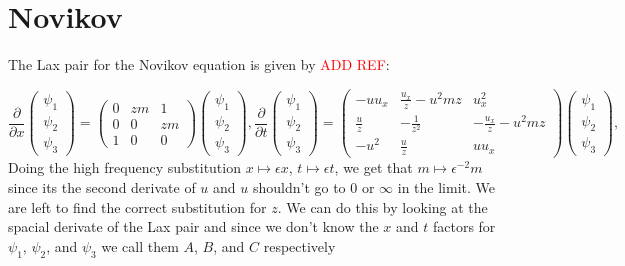 \documentclass[english,master]{liumaiex}
\theoremstyle{plain}
\theoremstyle{definition}
\newcommand\todo[1]{\textcolor{red}{#1}}
\begin{document}
\section{Novikov}

The Lax pair for the Novikov equation is given by \todo{ADD REF}:

\begin{subequations}
  \label{eq:Novikov-lax}
  \begin{equation}
    \label{eq:Novikov-lax-x}
    \frac{\partial}{\partial x}
    \begin{pmatrix} \psi_1 \\ \psi_2 \\ \psi_3 \end{pmatrix} =
    \begin{pmatrix}
      0 & zm & 1 \\
      0 & 0 & zm \\
      1 & 0 & 0
    \end{pmatrix}
    \begin{pmatrix} \psi_1 \\ \psi_2 \\ \psi_3 \end{pmatrix}
    ,
  \end{equation}
  \begin{equation}
    \label{eq:Novikov-lax-t}
    \frac{\partial}{\partial t}
    \begin{pmatrix} \psi_1 \\ \psi_2 \\ \psi_3 \end{pmatrix} =
    \begin{pmatrix}
      -u u_x & \frac{u_x}{z}-u^2 mz & u_x^2 \\
      \frac{u}{z} & - \frac{1}{z^2} & - \frac{u_x}{z} - u^2 mz \\
      -u^2 & \frac{u}{z} & uu_x
    \end{pmatrix}
    \begin{pmatrix} \psi_1 \\ \psi_2 \\ \psi_3 \end{pmatrix}
    ,
  \end{equation}
\end{subequations}
%
Doing the high frequency substitution $x \mapsto \epsilon x$, $t \mapsto \epsilon t$, we get that $m \mapsto \epsilon^{-2} m$ since its the second derivate of $u$ and $u$ shouldn't go to $0$ or $\infty$ in the limit. We are left to find the correct substitution for $z$. We can do this by looking at the spacial derivate of the Lax pair and since we don't know the $x$ and $t$ factors for $\psi_1$, $\psi_2$, and $\psi_3$ we call them $A$, $B$, and $C$ respectively
\end{document}
